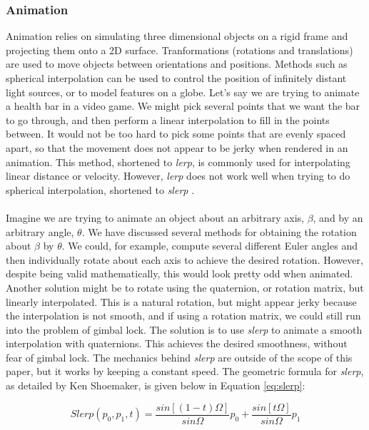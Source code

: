 \subsubsection{Animation}
Animation relies on simulating three dimensional objects on a rigid frame and projecting them onto a 2D surface.
Tranformations (rotations and translations) are used to move objects between orientations and positions.
Methods such as spherical interpolation can be used to control the position of infinitely distant light sources, or to model features on a globe.
Let's say we are trying to animate a health bar in a video game.
We might pick several points that we want the bar to go through, and then perform a linear interpolation to fill in the points between.
It would not be too hard to pick some points that are evenly spaced apart, so that the movement does not appear to be jerky when rendered in an animation.
This method, shortened to \textit{lerp}, is commonly used for interpolating linear distance or velocity.
However, \textit{lerp} does not work well when trying to do spherical interpolation, shortened to \textit{slerp} \cite{animation}. 
\\ \\ Imagine we are trying to animate an object about an arbitrary axis, $\beta$, and by an arbitrary angle, $\theta$.
We have discussed several methods for obtaining the rotation about $\beta$ by $\theta$.
We could, for example, compute several different Euler angles and then individually rotate about each axis to achieve the desired rotation.
However, despite being valid mathematically, this would look pretty odd when animated.
Another solution might be to rotate using the quaternion, or rotation matrix, but linearly interpolated.
This is a natural rotation, but might appear jerky because the interpolation is not smooth, and if using a rotation matrix, we could still run into the problem of gimbal lock.
The solution is to use \textit{slerp} to animate a smooth interpolation with quaternions.
This achieves the desired smoothness, without fear of gimbal lock.
The mechanics behind \textit{slerp} are outside of the scope of this paper, but it works by keeping a constant speed.
The geometric formula for \textit{slerp}, as detailed by Ken Shoemaker, is given below in Equation \ref{eq:slerp}:

\begin{equation}
	Slerp(p_0, p_1, t) = \frac{sin[(1-t)\Omega]}{sin\Omega}p_0 + \frac{sin[t\Omega]}{sin\Omega}p_1
	\label{eq:slerp}
\end{equation}

